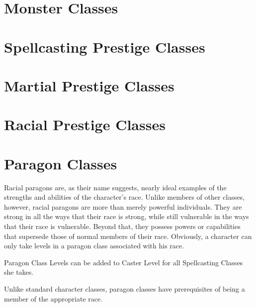 \section{Monster Classes}


\pagebreak

\section{Spellcasting Prestige Classes}


\pagebreak

\pagebreak

\pagebreak

\pagebreak

\pagebreak

\section{Martial Prestige Classes}

\pagebreak

\section{Racial Prestige Classes}

\pagebreak

\section{Paragon Classes}

Racial paragons are, as their name suggests, nearly ideal examples of the strengths and abilities of the character’s race. Unlike members of other classes, however, racial paragons are more than merely powerful individuals. They are strong in all the ways that their race is strong, while still vulnerable in the ways that their race is vulnerable. Beyond that, they possess powers or capabilities that supersede those of normal members of their race. Obviously, a character can only take levels in a paragon class associated with his race.

Paragon Class Levels can be added to Caster Level for all Spellcasting Classes she takes.

Unlike standard character classes, paragon classes have prerequisites of being a member of the appropriate race.

